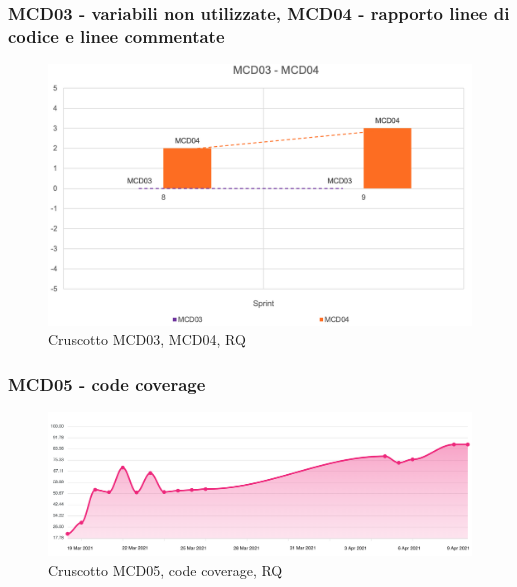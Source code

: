 \subsubsection*{MCD03 - variabili non utilizzate, MCD04 - rapporto linee di codice e linee commentate}
\begin{figure}[H] 
    \centering
    \includegraphics[scale = 0.55]{immagini/MCD03-04.png}
    \caption{Cruscotto MCD03, MCD04, RQ}
\end{figure}

\subsubsection*{MCD05 - code coverage}
\begin{figure}[H] 
    \centering
    \includegraphics[scale = 0.4]{immagini/MCD05.png}
    \caption{Cruscotto MCD05, code coverage, RQ}
\end{figure}


